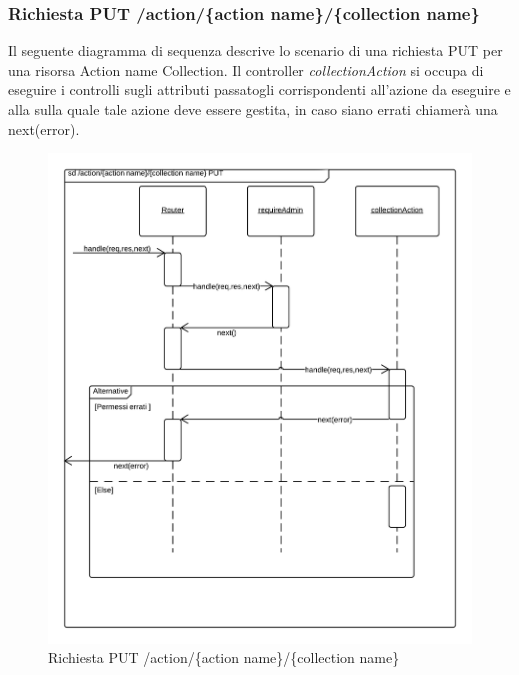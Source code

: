 \subsubsection{Richiesta PUT /action/\{action name\}/\{collection name\}} 
Il seguente diagramma di sequenza descrive lo scenario di una richiesta PUT per una risorsa Action name Collection.
Il controller \emph{collectionAction} si occupa di eseguire i controlli sugli attributi passatogli corrispondenti all'azione da eseguire e alla  sulla quale tale azione deve essere gestita, in caso siano errati chiamerà una next(error).
\begin{figure}[H]
	\begin{center} 
		\includegraphics[scale=0.20]{scenari/Action Name Collection PUT.png} 
		\caption{Richiesta PUT /action/\{action name\}/\{collection name\}}
	\end{center} 
\end{figure}

\pagebreak
